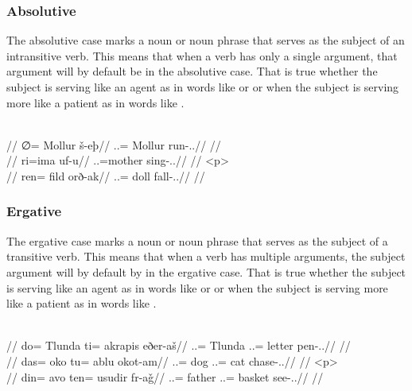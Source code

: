 \subsubsection{Absolutive}
\label{subsubsec:tvk-nouns-absolutive}

The absolutive case marks a noun or noun phrase that serves as the subject of an intransitive verb. This means that when a verb has only a single argument, that argument will by default be in the absolutive case. That is true whether the subject is serving like an agent as in words like   or   or when the subject is serving more like a patient as in words like  .

	\begingl
		\glpreamble{}\\
		//
		\gla ∅= Mollur š-eþ//
		\glb \An.\Sg.\Abs= Mollur run-\Ind.\Npst.\Prg//
		\glft{}//
	\endgl
	\a<a2>\begingl
		\glpreamble{}\\
		//
		\gla ri=ima uf-u//
		\glb \An.\Pc.\Abs=mother sing-\Ind.\Npst.\Imp//
		\glft{}//
	\endgl
	\begingl
		\glpreamble{}\\
		//
		\gla ren= fild orð-ak//
		\glb \In.\Pl.\Abs= doll fall-\Ind.\Pst.\Pfv//
		\glft{}//
	\endgl
\xe

\subsubsection{Ergative}
\label{subsubsec:tvk-nouns-ergative}

The ergative case marks a noun or noun phrase that serves as the subject of a transitive verb. This means that when a verb has multiple arguments, the subject argument will by default by in the ergative case. That is true whether the subject is serving like an agent as in words like   or   or when the subject is serving more like a patient as in words like  .

	\begingl
		\glpreamble{}\\
		//
		\gla do= Tlunda ti= akrapis eðer-aš//
		\glb \An.\Sg.\Erg= Tlunda \In.\Sg.\Acc= letter pen-\Ind.\Npst.\Rtsp//
		\glft{}//
	\endgl
	\a<a2>\begingl
		\glpreamble{}\\
		//
		\gla das= oko tu= ablu okot-am//
		\glb \An.\Pc.\Erg= dog \An.\Sg.\Acc= cat chase-\Ind.\Pst.\Imp//
		\glft{}//
	\endgl
	\begingl
		\glpreamble{}\\
		//
		\gla din= avo ten= usudir fr-aǧ//
		\glb \An.\Pl.\Erg= father \In.\Pl.\Acc= basket see-\Ind.\Pst.\Rtsp//
		\glft{}//
	\endgl
\xe

